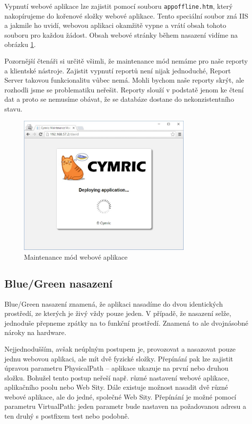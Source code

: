 Vypnutí webové aplikace lze zajistit pomocí souboru \texttt{appoffline.htm}, který nakopírujeme do kořenové složky webové aplikace. Tento speciální soubor zná IIS a jakmile ho uvidí, webovou aplikaci okamžitě vypne a vrátí obsah tohoto souboru pro každou žádost. Obsah webové stránky během nasazení vidíme na obrázku \ref{fig:maintenance_mode}.

Pozornější čtenáři si určitě všimli, že maintenance mód nemáme pro naše reporty a klientské nástroje. Zajistit vypnutí reportů není nijak jednoduché, Report Server takovou funkcionalitu vůbec nemá. Mohli bychom naše reporty skrýt, ale rozhodli jsme se problematiku neřešit. Reporty slouží v podstatě jenom ke čtení dat a proto se nemusíme obávat, že se databáze dostane do nekonzistentního stavu.

\begin{figure}[]
  \centering
  \includegraphics[height=7cm]{fig/maintenance_mode.jpg}
  \caption{Maintenance mód webové aplikace}
  \label{fig:maintenance_mode}
\end{figure}

\subsection{Blue/Green nasazení}
Blue/Green nasazení znamená, že aplikaci nasadíme do dvou identických prostředí, ze kterých je živý vždy pouze jeden. V případě, že nasazení selže, jednoduše přepneme zpátky na to funkční prostředí. Znamená to ale dvojnásobné nároky na hardware. 

Nejjednodušším, avšak neúplným postupem je, provozovat a nasazovat pouze jednu webovou aplikaci, ale mít dvě fyzické složky. Přepínání pak lze zajistit úpravou parametru PhysicalPath -- aplikace ukazuje na první nebo druhou složku. Bohužel tento postup neřeší např. různé nastavení webové aplikace, aplikačního poolu nebo Web Sity. Dále existuje možnost nasadit dvě různé webové aplikace, ale do jedné, společné Web Sity. Přepínání je možné pomocí parametru VirtualPath: jeden parametr bude nastaven na požadovanou adresu a ten druhý s postfixem test nebo podobně. 

